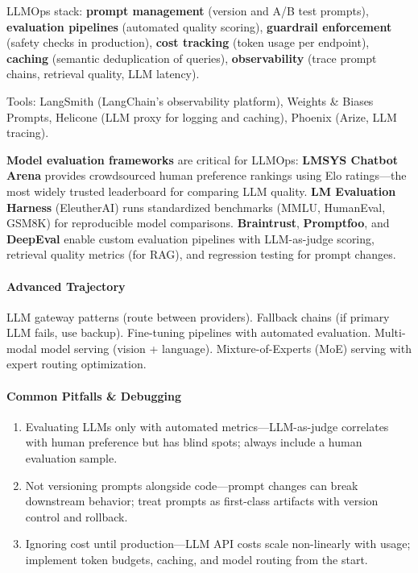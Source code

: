 \documentclass[11pt, a4paper, oneside]{report}
\begin{document}
LLMOps stack: \textbf{prompt management} (version and A/B test prompts), \textbf{evaluation pipelines} (automated quality scoring), \textbf{guardrail enforcement} (safety checks in production), \textbf{cost tracking} (token usage per endpoint), \textbf{caching} (semantic deduplication of queries), \textbf{observability} (trace prompt chains, retrieval quality, LLM latency).

Tools: LangSmith (LangChain's observability platform), Weights \& Biases Prompts, Helicone (LLM proxy for logging and caching), Phoenix (Arize, LLM tracing).

\textbf{Model evaluation frameworks} are critical for LLMOps: \textbf{LMSYS Chatbot Arena} provides crowdsourced human preference rankings using Elo ratings---the most widely trusted leaderboard for comparing LLM quality. \textbf{LM Evaluation Harness} (EleutherAI) runs standardized benchmarks (MMLU, HumanEval, GSM8K) for reproducible model comparisons. \textbf{Braintrust}, \textbf{Promptfoo}, and \textbf{DeepEval} enable custom evaluation pipelines with LLM-as-judge scoring, retrieval quality metrics (for RAG), and regression testing for prompt changes.

\paragraph{Advanced Trajectory} LLM gateway patterns (route between providers). Fallback chains (if primary LLM fails, use backup). Fine-tuning pipelines with automated evaluation. Multi-modal model serving (vision + language). Mixture-of-Experts (MoE) serving with expert routing optimization.

\paragraph{Common Pitfalls \& Debugging}
\begin{enumerate}[leftmargin=*]
\item Evaluating LLMs only with automated metrics---LLM-as-judge correlates with human preference but has blind spots; always include a human evaluation sample.
\item Not versioning prompts alongside code---prompt changes can break downstream behavior; treat prompts as first-class artifacts with version control and rollback.
\item Ignoring cost until production---LLM API costs scale non-linearly with usage; implement token budgets, caching, and model routing from the start.
\end{enumerate}
\end{document}
